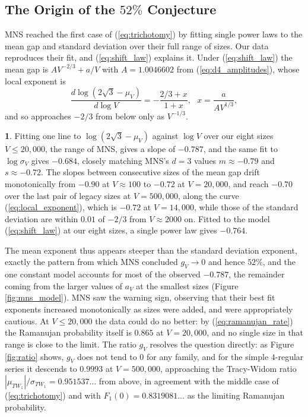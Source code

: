 \documentclass[12pt,oneside,english]{amsart}
\numberwithin{equation}{section}
\numberwithin{figure}{section}
\numberwithin{table}{section}
\theoremstyle{plain}
\numberwithin{thm}{section}
\theoremstyle{plain}
\theoremstyle{plain}
\theoremstyle{plain}
\theoremstyle{definition}
\theoremstyle{definition}
\newtheorem{numresult}[thm]{\protect\numresultname}
\theoremstyle{definition}
\theoremstyle{remark}
\providecommand{\numresultname}{Numerical Result}
\begin{document}
\subsection{\label{subsec:mns_diagnosis}The Origin of the $52\%$ Conjecture}

MNS reached the first case of (\ref{eq:trichotomy}) by fitting single
power laws to the mean gap and standard deviation over their full
range of sizes. Our data reproduces their fit, and (\ref{eq:shift_law})
explains it. Under (\ref{eq:shift_law}) the mean gap is $AV^{-2/3}+a/V$
with $A=1.0046602$ from (\ref{eq:d4_amplitudes}), whose local exponent
is
\begin{equation}
\frac{d\log\left(2\sqrt{3}-\mu_{V}\right)}{d\log V}=-\frac{2/3+x}{1+x},\ \ \ x=\frac{a}{AV^{1/3}},\label{eq:local_exponent}
\end{equation}
and so approaches $-2/3$ from below only as $V^{-1/3}$.
\begin{numresult}
\label{nr:mns}Fitting one line to $\log\left(2\sqrt{3}-\mu_{V}\right)$
against $\log V$ over our eight sizes $V\leq20{,}000$, the range
of MNS, gives a slope of $-0.787$, and the same fit to $\log\sigma_{V}$
gives $-0.684$, closely matching MNS's $d=3$ values $m\approx-0.79$
and $s\approx-0.72$. The slopes between consecutive sizes of the mean
gap drift monotonically from $-0.90$ at $V\approx100$ to $-0.72$
at $V=20{,}000$, and reach $-0.70$ over the last pair of legacy sizes
at $V=500{,}000$, along the curve (\ref{eq:local_exponent}), which
is $-0.72$ at $V=14{,}000$, while those of the standard deviation
are within $0.01$ of $-2/3$ from $V\approx2000$ on. Fitted to the
model (\ref{eq:shift_law}) at our eight sizes, a single power law
gives $-0.764$.
\end{numresult}
The mean exponent thus appears steeper than the standard deviation
exponent, exactly the pattern from which MNS concluded $g_{V}\rightarrow0$
and hence $52\%$, and the one constant model accounts for most of
the observed $-0.787$, the remainder coming from the larger values
of $a_{V}$ at the smallest sizes (Figure \ref{fig:mns_model}). MNS
saw the warning sign, observing that their best fit exponents increased
monotonically as sizes were added, and were appropriately cautious.
At $V\leq20{,}000$ the data could do no better: by (\ref{eq:ramanujan_rate})
the Ramanujan probability itself is $0.865$ at $V=20{,}000$, and
no single size in that range is close to the limit. The ratio $g_{V}$
resolves the question directly: as Figure \ref{fig:ratio} shows,
$g_{V}$ does not tend to $0$ for any family, and for the simple $4$-regular
series it descends to $0.9993$ at $V=500{,}000$, approaching the
Tracy-Widom ratio $\left|\mu_{TW_{1}}\right|/\sigma_{TW_{1}}=0.951537\dots$
from above, in agreement with the middle case of (\ref{eq:trichotomy})
and with $F_{1}(0)=0.8319081\dots$ as the limiting Ramanujan probability.
\end{document}
